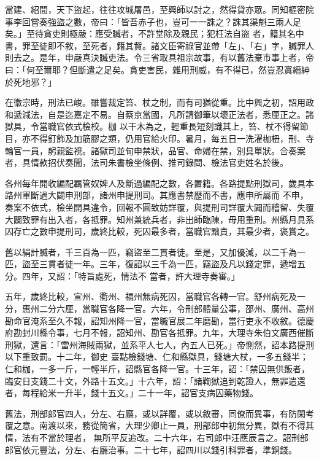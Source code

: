 \begin{pinyinscope}
 當建、紹間，天下盜起，往往攻城屠邑，至興師以討之，然得貸亦眾。同知樞密院事李回嘗奏強盜之數，帝曰：「皆吾赤子也，豈可一一誅之？誅其渠魁三兩人足矣。」至待貪吏則極嚴：應受贓者，不許堂除及親民；犯枉法自盜
 者，籍其名中書，罪至徒即不敘，至死者，籍其貲。諸文臣寄祿官並帶「左」、「右」字，贓罪人則去之。是年，申嚴真決贓吏法。令三省取具祖宗故事，有以舊法棄市事上者，帝曰：「何至爾耶？但斷遣之足矣。貪吏害民，雜用刑威，有不得已，然豈忍寘縉紳於死地邪？」



 在徽宗時，刑法已峻。雖嘗裁定笞、杖之制，而有司猶從重。比中興之初，詔用政和遞減法，自是迄嘉定不易。自蔡京當國，凡所請御筆以壞正法者，悉厘正之。諸獄具，令當職官依式檢校。枷
 以干木為之，輕重長短刻識其上，笞、杖不得留節目，亦不得釘飾及加筋膠之類，仍用官給火印。暑月，每五日一洗濯枷杻，刑、寺輪官一員，躬親監視。諸獄司並旬申禁狀，品官、命婦在禁，別具單狀。合奏案者，具情款招伏奏聞，法司朱書檢坐條例、推司錄問、檢法官吏姓名於後。



 各州每年開收編配羈管奴婢人及斷過編配之數，各置籍。各路提點刑獄司，歲具本路州軍斷過大闢申刑部，諸州申提刑司。其應書禁歷而不書，應申所屬而
 不申，奏案不依式，檢坐開具違令，回報不圓致妨詳覆，與提刑司詳覆大闢而稽留、失覆大闢致罪有出入者，各抵罪。知州兼統兵者，非出師臨陳，毋用重刑。州縣月具系囚存亡之數申提刑司，歲終比較，死囚最多者，當職官黜責，其最少者，褒賞之。



 舊以絹計贓者，千三百為一匹，竊盜至二貫者徒。至是，又加優減，以二千為一匹，盜至三貫者徒一年。三年，復詔以三千為一匹，竊盜及凡以錢定罪，遞增五分。四年，又詔：「特旨處死，情法不
 當者，許大理寺奏審。」



 五年，歲終比較，宣州、衢州、福州無病死囚，當職官各轉一官。舒州病死及一分，惠州二分六厘，當職官各降一官。六年，令刑部體量公事，邵州、廣州、高州勘命官淹系至久不報，詔知州降一官，當職官展二年磨勘，當行吏永不收敘。德慶府勘封川縣令事，七月不報，詔知州、勘官各抵罪。九年，大理寺朱伯文廣西催斷刑獄，還言：「雷州海賊兩獄，並系平人七人，內五人已死。」帝惻然，詔本路提刑以下重致罰。十二年，御史
 臺點檢錢塘、仁和縣獄具，錢塘大杖，一多五錢半；仁和枷，一多一斤，一輕半斤，詔縣官各降一官。十三年，詔：「禁囚無供飯者，臨安日支錢二十文，外路十五文。」十六年，詔：「諸鞫獄追到乾證人，無罪遣還者，每程給米一升半，錢十五文。」二十一年，詔官支病囚藥物錢。



 舊法，刑部郎官四人，分左、右廳，或以詳覆，或以敘審，同僚而異事，有防閑考覆之意。南渡以來，務從簡省，大理少卿止一員，刑部郎中初無分異，獄有不得其情，法有不當於理者，
 無所平反追改。二十六年，右司郎中汪應辰言之。詔刑部郎官依元豐法，分左、右廳治事。二十七年，詔四川以錢引科罪者，準銅錢。




\end{pinyinscope}
